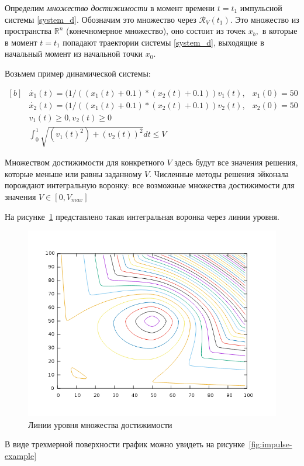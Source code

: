 Определим \emph{множество достижимости} в момент  времени $t=t_1$
импульсной системы \eqref{system_d}. Обозначим это множество через 
$ {\mathcal R}_V(t_1)$. Это множество из  пространства ${\mathbb R}^n$
(конечномерное  множество), оно состоит из точек $x_b,$ в  которые в
момент $t=t_1$ попадают траектории  системы \eqref{system_d}, выходящие
в начальный  момент из начальной точки $x_0$.

Возьмем пример динамической системы:

\begin{equation*}
  \begin{aligned}[b]
    &\dot{x_1}(t) = (1/((x_1(t)+0.1) * (x_2(t)+0.1))v_1(t), & x_1(0)=50\\
    &\dot{x_2}(t) = (1/((x_1(t)+0.1) * (x_2(t)+0.1))v_2(t), & x_2(0) = 50\\[8pt]
    &v_1(t) \ge 0, v_2(t) \ge 0 \\
    &\int_{0}^{1} \sqrt{(v_1(t)^2) + (v_2(t))^2} dt \le V
  \end{aligned}
\end{equation*}

Множеством достижимости для конкретного $V$ здесь будут все значения
решения, которые меньше или равны заданному $V$. Численные методы
решения эйконала порождают интегральную воронку: все возможные
множества достижимости для значения $V \in [0,V_{max}]$

На рисунке~\ref{fig:impulse-example-levels} представлено такая
интегральная воронка через линии уровня.

\begin{figure}[H]
  \centering
  \includegraphics[width=0.5\linewidth]{img/impulse-example-levels.png}
  \hfil \caption{Линии уровня множества достижимости}
  \label{fig:impulse-example-levels}
\end{figure}

В виде трехмерной поверхности график можно увидеть на рисунке~\ref{fig:impulse-example}

